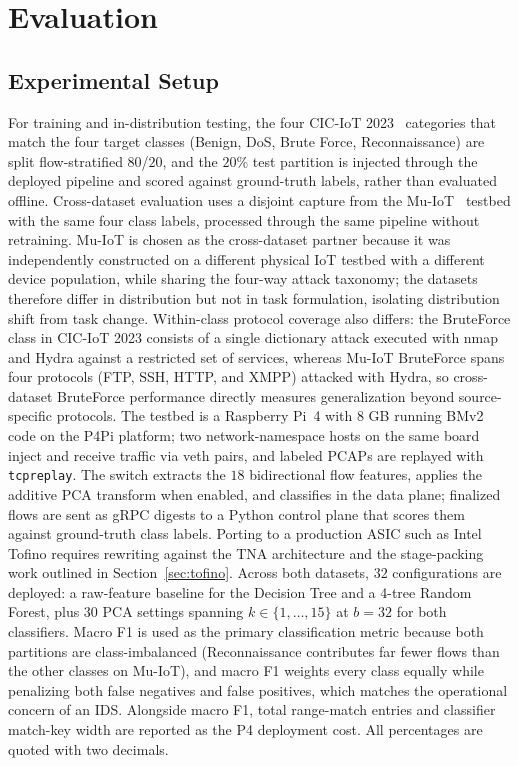 \documentclass[runningheads]{llncs}
\begin{document}
\section{Evaluation}\label{sec:eval}

\subsection{Experimental Setup}\label{sec:setup}

For training and in-distribution testing, the four CIC-IoT 2023~\cite{Neto2023} categories that match the four target classes (Benign, DoS, Brute Force, Reconnaissance) are split flow-stratified $80$/$20$, and the $20\%$ test partition is injected through the deployed pipeline and scored against ground-truth labels, rather than evaluated offline. Cross-dataset evaluation uses a disjoint capture from the Mu-IoT~\cite{Clinton2024muiot} testbed with the same four class labels, processed through the same pipeline without retraining. Mu-IoT is chosen as the cross-dataset partner because it was independently constructed on a different physical IoT testbed with a different device population, while sharing the four-way attack taxonomy; the datasets therefore differ in distribution but not in task formulation, isolating distribution shift from task change. Within-class protocol coverage also differs: the BruteForce class in CIC-IoT 2023 consists of a single dictionary attack executed with nmap and Hydra against a restricted set of services, whereas Mu-IoT BruteForce spans four protocols (FTP, SSH, HTTP, and XMPP) attacked with Hydra, so cross-dataset BruteForce performance directly measures generalization beyond source-specific protocols. The testbed is a Raspberry Pi~4 with 8 GB running BMv2 code on the P4Pi platform; two network-namespace hosts on the same board inject and receive traffic via veth pairs, and labeled PCAPs are replayed with \texttt{tcpreplay}. The switch extracts the $18$ bidirectional flow features, applies the additive PCA transform when enabled, and classifies in the data plane; finalized flows are sent as gRPC digests to a Python control plane that scores them against ground-truth class labels. Porting to a production ASIC such as Intel Tofino requires rewriting against the TNA architecture and the stage-packing work outlined in Section~\ref{sec:tofino}. Across both datasets, $32$ configurations are deployed: a raw-feature baseline for the Decision Tree and a 4-tree Random Forest, plus $30$ PCA settings spanning $k\!\in\!\{1,\dots,15\}$ at $b{=}32$ for both classifiers. Macro F1 is used as the primary classification metric because both partitions are class-imbalanced (Reconnaissance contributes far fewer flows than the other classes on Mu-IoT), and macro F1 weights every class equally while penalizing both false negatives and false positives, which matches the operational concern of an IDS. Alongside macro F1, total range-match entries and classifier match-key width are reported as the P4 deployment cost. All percentages are quoted with two decimals.
\end{document}
